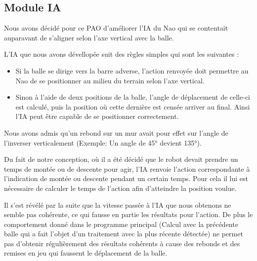 \subsection{Module IA}
\label{sub:Module IA}
\par Nous avons décidé pour ce PAO d'améliorer l'IA du Nao qui se contentait
auparavant de s'aligner selon l'axe vertical avec la balle.

\par L'IA que nous avons dévellopée suit des règles simples qui sont les
suivantes :

\begin{itemize}
	\item Si la balle se dirige vers la barre adverse, l'action renvoyée doit
		permettre au Nao de se positionner au milieu du terrain selon l'axe
		vertical.
	\item Sinon à l'aide de deux positions de la balle, l'angle de déplacement
		de celle-ci est calculé, puis la position où cette dernière est censée
		arriver au final. Ainsi l'IA peut être capable de se positionner
		correctement.
\end{itemize}

\par Nous avons admis qu'un rebond sur un mur avait pour effet sur l'angle de
l'inverser verticalement (Exemple: Un angle de 45° devient 135°).

\par Du fait de notre conception, où il a été décidé que le robot devait
prendre un temps de montée ou de descente pour agir, l'IA renvoie l'action correspondante
à l'indication de montée ou descente pendant un certain temps.
Pour cela il lui est nécessaire de calculer le temps de l'action afin
d'atteindre la position voulue.

\par Il s'est révélé par la suite que la vitesse passée à l'IA que nous obtenons ne
semble pas cohérente, ce qui fausse en partie les résultats pour l'action. De plus 
le comportement donné dans le programme principal (Calcul avec la précédente balle
qui a fait l'objet d'un traitement avec la plus récente détectée) ne permet pas 
d'obtenir régulièrement des résultats cohérents à cause des rebonds et des remises 
en jeu qui faussent le déplacement de la balle.